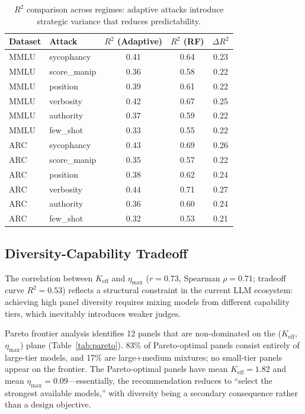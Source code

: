 \documentclass[11pt,a4paper]{article}
\begin{document}
\begin{table}[t]
\centering
\caption{$R^2$ comparison across regimes: adaptive attacks introduce strategic variance that reduces predictability.}
\label{tab:bft_r2}
\small
\begin{tabular}{llccc}
\toprule
\textbf{Dataset} & \textbf{Attack} & $R^2$ \textbf{(Adaptive)} & $R^2$ \textbf{(RF)} & $\Delta R^2$ \\
\midrule
MMLU & sycophancy & 0.41 & 0.64 & 0.23 \\
MMLU & score\_manip & 0.36 & 0.58 & 0.22 \\
MMLU & position & 0.39 & 0.61 & 0.22 \\
MMLU & verbosity & 0.42 & 0.67 & 0.25 \\
MMLU & authority & 0.37 & 0.59 & 0.22 \\
MMLU & few\_shot & 0.33 & 0.55 & 0.22 \\
ARC & sycophancy & 0.43 & 0.69 & 0.26 \\
ARC & score\_manip & 0.35 & 0.57 & 0.22 \\
ARC & position & 0.38 & 0.62 & 0.24 \\
ARC & verbosity & 0.44 & 0.71 & 0.27 \\
ARC & authority & 0.36 & 0.60 & 0.24 \\
ARC & few\_shot & 0.32 & 0.53 & 0.21 \\
\bottomrule
\end{tabular}
\end{table}

\subsection{Diversity-Capability Tradeoff}
\label{sec:tradeoff}

The correlation between $K_{\mathrm{eff}}$ and $\eta_{\max}$ ($r = 0.73$, Spearman $\rho = 0.71$; tradeoff curve $R^2 = 0.53$) reflects a structural constraint in the current LLM ecosystem: achieving high panel diversity requires mixing models from different capability tiers, which inevitably introduces weaker judges.

Pareto frontier analysis identifies 12 panels that are non-dominated on the ($K_{\mathrm{eff}}$, $\eta_{\max}$) plane (Table~\ref{tab:pareto}). 83\% of Pareto-optimal panels consist entirely of large-tier models, and 17\% are large+medium mixtures; no small-tier panels appear on the frontier.
The Pareto-optimal panels have mean $K_{\mathrm{eff}} = 1.82$ and mean $\eta_{\max} = 0.09$---essentially, the recommendation reduces to ``select the strongest available models,'' with diversity being a secondary consequence rather than a design objective.
\end{document}
